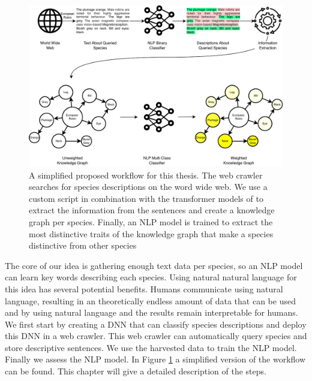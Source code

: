 \documentclass[a4paper, 12pt, oneside]{book} %
\begin{document}
\begin{figure} [htpb]
    \centering
    \includegraphics[width=\textwidth]{figures/workflow.pdf}
    \caption[Proposed Workflow]{A simplified proposed workflow for this thesis. The web crawler searches for species descriptions on the word wide web. We use a custom script in combination with the transformer models of \textcite{wolf_huggingfaces_2020} to extract the information from the sentences and create a knowledge graph per species. Finally, an NLP model is trained to extract the most distinctive traits of the knowledge graph that make a species distinctive from other species}
    \label{fig:workflow}
\end{figure}

The core of our idea is gathering enough text data per species, so an NLP model can learn key words describing each species.
Using natural natural language for this idea has several potential benefits.
Humans communicate using natural language, resulting in an theoretically endless amount of data that can be used and by using natural language and the results remain interpretable for humans.
We first start by creating a DNN that can classify species descriptions and deploy this DNN in a web crawler.
This web crawler can automatically query species and store descriptive sentences.
We use the harvested data to train the NLP model.
Finally we assess the NLP model.
In Figure \ref{fig:workflow} a simplified version of the workflow can be found.
This chapter will give a detailed description of the steps.
\end{document}
